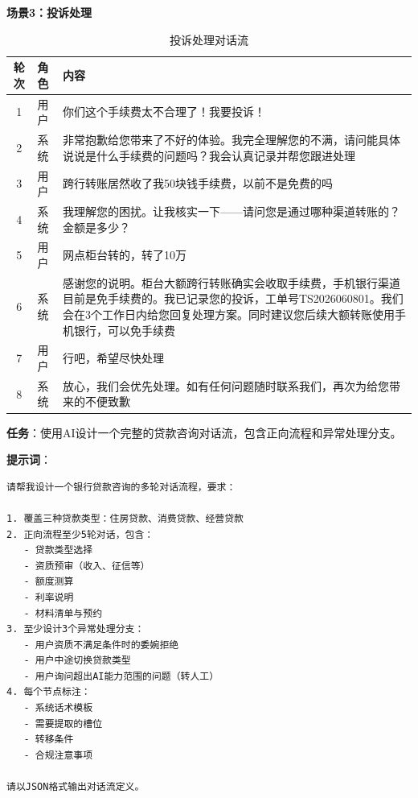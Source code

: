 \textbf{场景3：投诉处理}

\begin{table}[H]
\centering
\small
\begin{tabular}{clp{7cm}}
\toprule
\textbf{轮次} & \textbf{角色} & \textbf{内容} \\
\midrule
1 & 用户 & 你们这个手续费太不合理了！我要投诉！ \\
2 & 系统 & 非常抱歉给您带来了不好的体验。我完全理解您的不满，请问能具体说说是什么手续费的问题吗？我会认真记录并帮您跟进处理 \\
3 & 用户 & 跨行转账居然收了我50块钱手续费，以前不是免费的吗 \\
4 & 系统 & 我理解您的困扰。让我核实一下——请问您是通过哪种渠道转账的？金额是多少？ \\
5 & 用户 & 网点柜台转的，转了10万 \\
6 & 系统 & 感谢您的说明。柜台大额跨行转账确实会收取手续费，手机银行渠道目前是免手续费的。我已记录您的投诉，工单号TS2026060801。我们会在3个工作日内给您回复处理方案。同时建议您后续大额转账使用手机银行，可以免手续费 \\
7 & 用户 & 行吧，希望尽快处理 \\
8 & 系统 & 放心，我们会优先处理。如有任何问题随时联系我们，再次为给您带来的不便致歉 \\
\bottomrule
\end{tabular}
\caption{投诉处理对话流}
\end{table}

\begin{practicebox}[用AI设计贷款咨询对话流]
\textbf{任务}：使用AI设计一个完整的贷款咨询对话流，包含正向流程和异常处理分支。

\textbf{提示词}：

\begin{lstlisting}
请帮我设计一个银行贷款咨询的多轮对话流程，要求：

1. 覆盖三种贷款类型：住房贷款、消费贷款、经营贷款
2. 正向流程至少5轮对话，包含：
   - 贷款类型选择
   - 资质预审（收入、征信等）
   - 额度测算
   - 利率说明
   - 材料清单与预约
3. 至少设计3个异常处理分支：
   - 用户资质不满足条件时的委婉拒绝
   - 用户中途切换贷款类型
   - 用户询问超出AI能力范围的问题（转人工）
4. 每个节点标注：
   - 系统话术模板
   - 需要提取的槽位
   - 转移条件
   - 合规注意事项

请以JSON格式输出对话流定义。
\end{lstlisting}
\end{practicebox}

